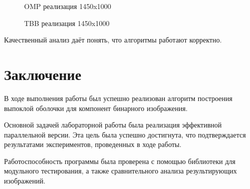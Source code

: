 \documentclass{report}
\begin{document}
\begin{figure}[H]
\caption{OMP реализация 1450x1000}
\end{figure}

\begin{figure}[H]
\caption{TBB реализация 1450x1000}
\end{figure}

\par
Качественный анализ даёт понять, что алгоритмы работают корректно.

\newpage

\section*{Заключение}
В ходе выполнения работы был успешно реализован алгоритм построения выпоклой оболочки для компонент бинарного изображения.
\par 
Основной задачей лабораторной работы была реализация эффективной параллельной версии. Эта цель была успешно достигнута, что подтверждается результатами экспериментов, проведенных в ходе работы. 
\par 
Работоспособность программы была проверена с помощью библиотеки для модульного тестирования, а также сравнительного анализа результирующих изображений.
\newpage
\end{document}
